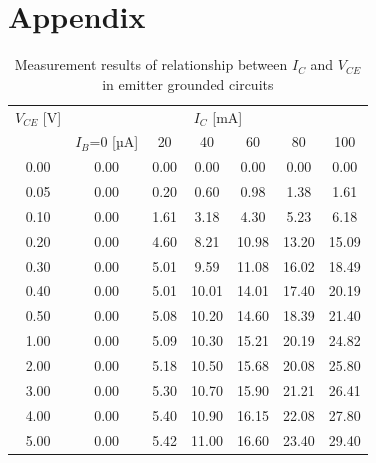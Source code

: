 \documentclass[a4paper,10pt]{jsarticle}
\begin{document}
\section{\textrm{Appendix}}
\begin{table}[H]
  \centering
  \caption{Measurement results of relationship between $I_C$ and $V_{CE}$ in emitter grounded circuits}
    \begin{tabular}{ccccccc}
    \multicolumn{1}{l}{$V_{CE}$ [V]} & \multicolumn{6}{c}{$I_C$ [mA]} \\
          & $I_B$=0 [µA] & 20    & 40    & 60    & 80    & 100 \\
    \midrule
    \midrule
    0.00  & 0.00  & 0.00  & 0.00  & 0.00  & 0.00  & 0.00 \\
    0.05  & 0.00  & 0.20  & 0.60  & 0.98  & 1.38  & 1.61 \\
    0.10  & 0.00  & 1.61  & 3.18  & 4.30  & 5.23  & 6.18 \\
    0.20  & 0.00  & 4.60  & 8.21  & 10.98 & 13.20 & 15.09 \\
    0.30  & 0.00  & 5.01  & 9.59  & 11.08 & 16.02 & 18.49 \\
    0.40  & 0.00  & 5.01  & 10.01 & 14.01 & 17.40 & 20.19 \\
    0.50  & 0.00  & 5.08  & 10.20 & 14.60 & 18.39 & 21.40 \\
    1.00  & 0.00  & 5.09  & 10.30 & 15.21 & 20.19 & 24.82 \\
    2.00  & 0.00  & 5.18  & 10.50 & 15.68 & 20.08 & 25.80 \\
    3.00  & 0.00  & 5.30  & 10.70 & 15.90 & 21.21 & 26.41 \\
    4.00  & 0.00  & 5.40  & 10.90 & 16.15 & 22.08 & 27.80 \\
    5.00  & 0.00  & 5.42  & 11.00 & 16.60 & 23.40 & 29.40 \\
    \end{tabular}%
  \label{tab:addlabel}%
\end{table}%
\end{document}
